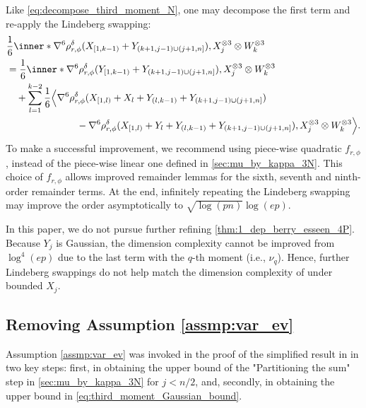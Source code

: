 \documentclass[aos]{imsart}
\begin{document}
Like \cref{eq:decompose_third_moment_N}, one may decompose the first term and re-apply the Lindeberg swapping:
\begin{equation*}
\begin{aligned}
    & \frac{1}{6} \inner*{\nabla^6 \rho_{r,\phi}^\delta(X_{[1,k-1)} + Y_{(k+1,j-1) \cup (j+1,n]}),
        X_j^{\otimes 3} \otimes W_k^{\otimes 3}
    } \\
    & = \frac{1}{6} \inner*{\nabla^6 \rho_{r,\phi}^\delta(Y_{[1,k-1)} + Y_{(k+1,j-1) \cup (j+1,n]}),
        X_j^{\otimes 3} \otimes W_k^{\otimes 3}
    } \\
    & \quad + \sum_{l=1}^{k-2} \frac{1}{6} \Big\langle
        \nabla^6 \rho_{r,\phi}^\delta(X_{[1,l)} +  X_l + Y_{(l,k-1)} + Y_{(k+1,j-1) \cup (j+1,n]}) \\
    & \hspace{1in} - \nabla^6 \rho_{r,\phi}^\delta(X_{[1,l)} +  Y_l + Y_{(l,k-1)} + Y_{(k+1,j-1) \cup (j+1,n]}), 
    X_j^{\otimes 3} \otimes W_k^{\otimes 3}
    \Big\rangle.
\end{aligned}
\end{equation*}
To make a successful improvement, we recommend using piece-wise quadratic $f_{r,\phi}$, instead of the piece-wise linear one defined in \cref{sec:mu_by_kappa_3N}. This choice of $f_{r,\phi}$ allows improved remainder lemmas for the sixth, seventh and ninth-order remainder terms. At the end, infinitely repeating the Lindeberg swapping may improve the order asymptotically to $\sqrt{\log(pn)} \log(ep)$. 

In this paper, we do not pursue further refining \cref{thm:1_dep_berry_esseen_4P}. Because $Y_j$ is Gaussian, the dimension complexity cannot be improved from $\log^4(ep)$ due to the last term with the $q$-th moment (i.e., $\nu_q$). Hence, further Lindeberg swappings do not help match the dimension complexity of  under bounded $X_j$.






\subsection{Removing Assumption \texorpdfstring{\eqref{assmp:var_ev}}{Assumption (VAR-EV)}} \label{sec:pf_without_var_ev}

Assumption \eqref{assmp:var_ev} was invoked in the proof of the simplified result in in two key steps: first, in obtaining the upper bound of the "Partitioning the sum" step in \cref{sec:mu_by_kappa_3N} for $j < n/2$,
and, secondly, in obtaining the upper bound in \cref{eq:third_moment_Gaussian_bound}.
\end{document}
